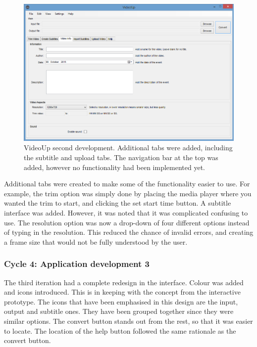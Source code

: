 \documentclass{sig-alternate-05-2015}
\begin{document}
\begin{figure} [h]
\includegraphics[scale=0.33]{dev2}
\caption{VideoUp second development. Additional tabs were added, including the subtitle and upload tabs. The navigation bar at the top was added, however no functionality had been implemented yet.}
\end{figure}

Additional tabs were created to make some of the functionality easier to use. For example, the trim option was simply done by placing the media player where you wanted the trim to start, and clicking the set start time button. A subtitle interface was added. However, it was noted that it was complicated confusing to use. The resolution option was now a drop-down of four different options instead of typing in the resolution. This reduced the chance of invalid errors, and creating a frame size that would not be fully understood by the user.

\subsubsection{Cycle 4: Application development 3}
The third iteration had a complete redesign in the interface. Colour was added and icons introduced. This is in keeping with the concept from the interactive prototype. The icons that have been emphasised in this design are the input, output and subtitle ones. They have been grouped together since they were similar options. The convert button stands out from the rest, so that it was easier to locate. The location of the help button followed the same rationale as the convert button.
\end{document}
